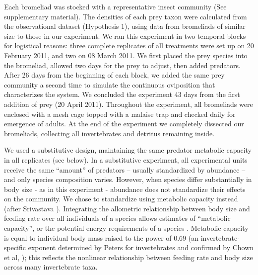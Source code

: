 Each bromeliad was stocked with a representative insect community (See
supplementary material). The densities of each prey taxon were
calculated from the observational dataset (Hypothesis 1), using data
from bromeliads of similar size to those in our experiment. We ran this
experiment in two temporal blocks for logistical reasons: three complete
replicates of all treatments were set up on 20 February 2011, and two on
08 March 2011. We first placed the prey species into the bromeliad,
allowed two days for the prey to adjust, then added predators. After 26
days from the beginning of each block, we added the same prey community
a second time to simulate the continuous oviposition that characterizes
the system. We concluded the experiment 43 days from the first addition
of prey (20 April 2011). Throughout the experiment, all bromeliads were
enclosed with a mesh cage topped with a malaise trap and checked daily
for emergence of adults. At the end of the experiment we completely
dissected our bromeliads, collecting all invertebrates and detritus
remaining inside.

We used a substitutive design, maintaining the same predator metabolic
capacity in all replicates (see below). In a substitutive experiment,
all experimental units receive the same ``amount'' of predators --
usually standardized by abundance -- and only species composition
varies. However, when species differ substantially in body size - as in
this experiment - abundance does not standardize their effects on
the community. We chose to standardize using metabolic capacity instead
(after Srivastava \citeyearpar{Srivastava2009a}). Integrating the
allometric relationship between body size and feeding rate
\citep{Brown2004, Wilby2005} over all individuals of a species allows
estimates of ``metabolic capacity'', or the potential energy
requirements of a species \citep{Srivastava2009a}. Metabolic capacity is
equal to individual body mass raised to the power of 0.69 (an
invertebrate-specific exponent determined by Peters
\citeyearpar{Peters1986} for invertebrates and confirmed by Chown et al,
\citeyearpar{Chown2007}); this reflects the nonlinear relationship
between feeding rate and body size across many invertebrate taxa.

